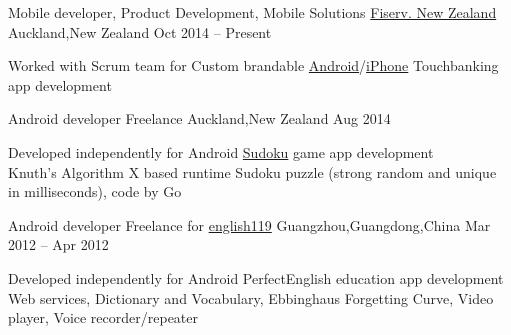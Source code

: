 
\begin{cventries}
	\cventry
	{Mobile developer, Product Development, Mobile Solutions}
	{\href{https://www.careers.fiserv.com/new-zealand}{Fiserv. New Zealand}}
	{Auckland,\enskip New Zealand}
	{Oct 2014 – Present}
	{
		\begin{cvitems}
			\item {Worked with Scrum team for Custom brandable \href{https://play.google.com/store/apps/details?id=com.fiserv.touchbankingasp&hl=en}{Android}/\href{https://itunes.apple.com/us/app/touchbanking/id386678211?mt=8}{iPhone} Touchbanking app development}
		\end{cvitems}
	}
\end{cventries}

\begin{cventries}
	\cventry
	{Android developer}
	{Freelance}
	{Auckland,\enskip New Zealand}
	{Aug 2014}
	{
		\begin{cvitems}
			\item {Developed independently for Android \href{https://play.google.com/store/apps/details?id=com.gmail.jiangyang5157.sudoku}{Sudoku} game app development\\
			Knuth's Algorithm X based runtime Sudoku puzzle (strong random and unique in milliseconds), code by Go}
		\end{cvitems}
	}
\end{cventries}

\begin{cventries}
	\cventry
	{Android developer}
	{Freelance for \href{http://www.english119.cn}{english119}}
	{Guangzhou,\enskip Guangdong,\enskip China}
	{Mar 2012 – Apr 2012}
	{
		\begin{cvitems}
			\item {Developed independently for Android PerfectEnglish education app development\\
				Web services, Dictionary and Vocabulary, Ebbinghaus Forgetting Curve, Video player, Voice recorder/repeater}
		\end{cvitems}
	}
\end{cventries}

